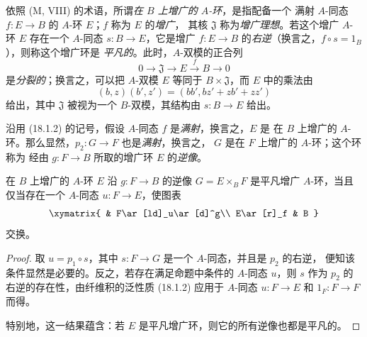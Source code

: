 \begin{env}[18.1.4]
\label{0.18.1.4-fr}
依照 (M, VIII) 的术语，所谓\emph{在 $B$ 上增广的 $A$-环}，是指配备一个
满射 $A$-同态 $f:E\to B$ 的 $A$-环 $E$；$f$ 称为 $E$ 的\emph{增广}，
其核 $\mathfrak{J}$ 称为\emph{增广理想}。若这个增广 $A$-环 $E$ 存在一个
$A$-同态 $s:B\to E$，它是增广
$f:E\to B$ 的\emph{右逆}（换言之，$f\circ s=1_B$），则称这个增广环是
\emph{平凡的}。此时，$A$-双模的正合列
\[
  0\longrightarrow\mathfrak{J}\longrightarrow E
  \xrightarrow{f}B\longrightarrow0
\]
是\emph{分裂的}；换言之，可以把 $A$-双模 $E$ 等同于
$B\times\mathfrak{J}$，而 $E$ 中的乘法由
\[
  (b,z)(b',z')=(bb',bz'+zb'+zz')
\]
给出，其中 $\mathfrak{J}$ 被视为一个 $B$-双模，其结构由 $s:B\to E$ 给出。
\end{env}

\begin{env}[18.1.5]
\label{0.18.1.5-fr}
沿用 (18.1.2) 的记号，假设 $A$-同态 $f$ 是\emph{满射}，换言之，$E$ 是
在 $B$ 上增广的 $A$-环。那么显然，$p_2:G\to F$ 也是\emph{满射}，换言之，
$G$ 是在 $F$ 上增广的 $A$-环；这个环称为
经由 $g:F\to B$ 所取的增广环 $E$ 的\emph{逆像}。
\end{env}

\begin{proposition}[18.1.6]
\label{0.18.1.6-fr}
在 $B$ 上增广的 $A$-环 $E$ 沿 $g:F\to B$ 的逆像
$G=E\times_BF$ 是平凡增广 $A$-环，当且仅当存在一个 $A$-同态
$u:F\to E$，使图表
\[
  \xymatrix{
    & F\ar[ld]_u\ar[d]^g\\
    E\ar[r]_f & B
  }
\]
交换。
\end{proposition}

\begin{proof}
取 $u=p_1\circ s$，其中 $s:F\to G$ 是一个 $A$-同态，并且是 $p_2$ 的右逆，
便知该条件显然是必要的。反之，若存在满足命题中条件的 $A$-同态 $u$，则
$s$ 作为 $p_2$ 的右逆的存在性，由纤维积的泛性质 (18.1.2) 应用于 $A$-同态
$u:F\to E$ 和 $1_F:F\to F$ 而得。

特别地，这一结果蕴含：若 $E$ 是平凡增广环，则它的所有逆像也都是平凡的。
\end{proof}

